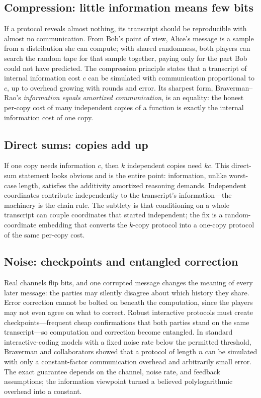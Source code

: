 \subsection{Compression: little information means few bits}
If a protocol reveals almost nothing, its transcript should be reproducible with almost no communication. From Bob's point of view, Alice's message is a sample from a distribution she can compute; with shared randomness, both players can search the random tape for that sample together, paying only for the part Bob could not have predicted. The compression principle states that a transcript of internal information cost $c$ can be simulated with communication proportional to $c$, up to overhead growing with rounds and error. Its sharpest form, Braverman--Rao's \emph{information equals amortized communication}, is an equality: the honest per-copy cost of many independent copies of a function is exactly the internal information cost of one copy.

\subsection{Direct sums: copies add up}
If one copy needs information $c$, then $k$ independent copies need $kc$. This direct-sum statement looks obvious and is the entire point: information, unlike worst-case length, satisfies the additivity amortized reasoning demands. Independent coordinates contribute independently to the transcript's information---the machinery is the chain rule. The subtlety is that conditioning on a whole transcript can couple coordinates that started independent; the fix is a random-coordinate embedding that converts the $k$-copy protocol into a one-copy protocol of the same per-copy cost.

\subsection{Noise: checkpoints and entangled correction}
Real channels flip bits, and one corrupted message changes the meaning of every later message: the parties may silently disagree about which history they share. Error correction cannot be bolted on beneath the computation, since the players may not even agree on what to correct. Robust interactive protocols must create checkpoints---frequent cheap confirmations that both parties stand on the same transcript---so computation and correction become entangled. In standard interactive-coding models with a fixed noise rate below the permitted threshold, Braverman and collaborators showed that a protocol of length $n$ can be simulated with only a constant-factor communication overhead and arbitrarily small error. The exact guarantee depends on the channel, noise rate, and feedback assumptions; the information viewpoint turned a believed polylogarithmic overhead into a constant.

